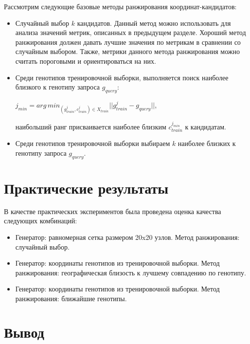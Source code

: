 Рассмотрим следующие базовые методы ранжирования координат-кандидатов:
\begin{itemize}
\item Случайный выбор $k$ кандидатов. Данный метод можно использовать для анализа значений метрик,
описанных в предыдущем разделе. Хороший метод ранжирования должен давать лучшие значения по
метрикам в сравнении со случайным выбором. Также, метрики данного метода ранжирования можно считать
пороговыми и ориентироваться на них.

\item Среди генотипов тренировочной выборки, выполняется поиск наиболее близкого к генотипу запроса $g_{query}$:

$ j_{min} = arg\,min_{\left(g^j_{train}, c^j_{train}\right) \in X_{train}} ||g^j_{train} - g_{query}||$,

наибольший ранг присваивается наиболее близким $c^{j_{min}}_{train}$ к кандидатам.

\item Среди генотипов тренировочной выборки выбираем $k$ наиболее близких к генотипу запроса $g_{query}$.
\end{itemize}

\section{Практические результаты}

В качестве практических экспериментов была проведена оценка качества следующих комбинаций:
\begin{itemize}
\item Генератор: равномерная сетка размером 20x20 узлов. Метод ранжирования: случайный выбор.

\item Генератор: координаты генотипов из тренировочной выборки. Метод ранжирования:
географическая близость к лучшему совпадению по генотипу.

\item Генератор: координаты генотипов из тренировочной выборки. Метод ранжирования:
ближайшие генотипы.
\end{itemize}
\section{Вывод}

